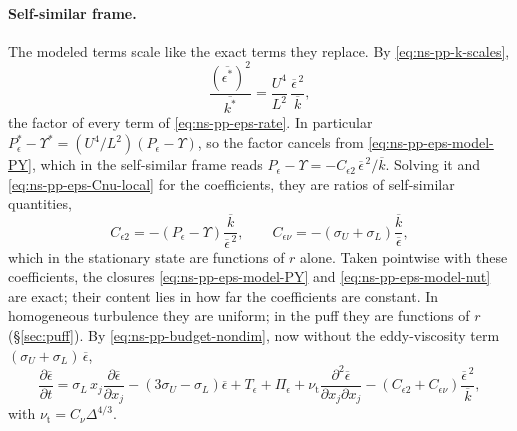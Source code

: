 \documentclass{article}
\begin{document}
\paragraph{Self-similar frame.}
The modeled terms scale like the exact terms they replace. By
\eqref{eq:ns-pp-k-scales},
\begin{equation}\label{eq:ns-pp-eps-model-scales}
  \frac{\left(\overline{\epsilon^*}\right)^2}{\overline{k^*}}
  = \frac{U^4}{L^2}\, \frac{\overline{\epsilon}^{\,2}}{\overline{k}} ,
\end{equation}
the factor of every term of \eqref{eq:ns-pp-eps-rate}. In particular
$P_\epsilon^* - \Upsilon^* = (U^4/L^2)(P_\epsilon - \Upsilon)$, so the factor
cancels from \eqref{eq:ns-pp-eps-model-PY}, which in the self-similar frame
reads $P_\epsilon - \Upsilon = -C_{\epsilon 2}\, \overline{\epsilon}^{\,2}/\overline{k}$.
Solving it and \eqref{eq:ns-pp-eps-Cnu-local} for the coefficients, they are
ratios of self-similar quantities,
\begin{equation}\label{eq:ns-pp-eps-coeffs}
  C_{\epsilon 2} = -\left( P_\epsilon - \Upsilon \right) \frac{\overline{k}}{\overline{\epsilon}^{\,2}} ,
  \qquad
  C_{\epsilon\nu} = -\left( \sigma_U + \sigma_L \right) \frac{\overline{k}}{\overline{\epsilon}} ,
\end{equation}
which in the stationary state are functions of $r$ alone. Taken pointwise
with these coefficients, the closures \eqref{eq:ns-pp-eps-model-PY} and
\eqref{eq:ns-pp-eps-model-nut} are exact; their content lies in how far the
coefficients are constant. In homogeneous turbulence they are uniform; in the
puff they are functions of $r$ (\S\ref{sec:puff}). By
\eqref{eq:ns-pp-budget-nondim}, now without the eddy-viscosity term
$(\sigma_U + \sigma_L)\, \overline{\epsilon}$,
\begin{equation}\label{eq:ns-pp-eps-model-nondim}
  \frac{\partial \overline{\epsilon}}{\partial t}
  = \sigma_L\, x_j \frac{\partial \overline{\epsilon}}{\partial x_j}
  - \left( 3\sigma_U - \sigma_L \right) \overline{\epsilon}
  + T_\epsilon + \Pi_\epsilon
  + \nu_{\mathrm{t}} \frac{\partial^2 \overline{\epsilon}}{\partial x_j \partial x_j}
  - \left( C_{\epsilon 2} + C_{\epsilon\nu} \right) \frac{\overline{\epsilon}^{\,2}}{\overline{k}} ,
\end{equation}
with $\nu_{\mathrm{t}} = C_\nu \Delta^{4/3}$.
\end{document}
